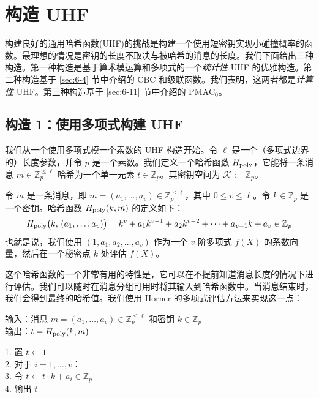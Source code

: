 \section{构造 UHF}\label{sec:7-2}

构建良好的通用哈希函数(UHF)的挑战是构建一个使用短密钥实现小碰撞概率的函数。最理想的情况是密钥的长度不取决与被哈希的消息的长度。我们下面给出三种构造。第一种构造是基于算术模运算和多项式的一个\emph{统计性} UHF 的优雅构造。第二种构造基于 \ref{sec:6-4} 节中介绍的 CBC 和级联函数。我们表明，这两者都是\emph{计算性} UHF。第三种构造基于 \ref{sec:6-11} 节中介绍的 $\mathrm{PMAC}_0$。

\subsection{构造 1：使用多项式构建 UHF}\label{subsec:7-2-1}

我们从一个使用多项式模一个素数的 UHF 构造开始。令 $\ell$ 是一个（多项式边界的）长度参数，并令 $p$ 是一个素数。我们定义一个哈希函数 $H_{\rm poly}$，它能将一条消息 $m\in\mathbb{Z}^{\leq\ell}_p$ 哈希为一个单一元素 $t\in\mathbb{Z}_p$。其密钥空间为 $\mathcal{K}:=\mathbb{Z}_p$。

令 $m$ 是一条消息，即 $m=(a_1,\dots,a_v)\in\mathbb{Z}^{\leq\ell}_p$，其中 $0\leq v\leq\ell$。令 $k\in\mathbb{Z}_p$ 是一个密钥。哈希函数 $H_{\rm poly}(k,m)$ 的定义如下：
\begin{equation}\label{eq:7-3}
H_{\rm poly}\big(k,\,(a_1,\dots,a_v)\big)=k^v+a_1k^{v-1}+a_2k^{v-2}+\cdots+a_{v-1}k+a_v\in\mathbb{Z}_p
\end{equation}
也就是说，我们使用 $(1,a_1,a_2,\dots,a_v)$ 作为一个 $v$ 阶多项式 $f(X)$ 的系数向量，然后在一个秘密点 $k$ 处评估 $f(X)$。

这个哈希函数的一个非常有用的特性是，它可以在不提前知道消息长度的情况下进行评估。我们可以随时在消息分组可用时将其输入到哈希函数中。当消息结束时，我们会得到最终的哈希值。我们使用 Horner 的多项式评估方法来实现这一点：

\vspace{5pt}

\hspace*{5pt} 输入：消息 $m=(a_1,\dots,a_v)\in\mathbb{Z}^{\leq\ell}_p$ 和密钥 $k\in\mathbb{Z}_p$\\
\hspace*{26pt} 输出：$t=H_{\rm poly}(k,m)$

\vspace{5pt}

\hspace*{5pt} 1. \quad 置 $t\leftarrow1$\\
\hspace*{26pt} 2. \quad 对于 $i=1,\dots,v$：\\
\hspace*{26pt} 3. \quad\quad\quad 令 $t\leftarrow t\cdot k+a_i\in\mathbb{Z}_p$\\
\hspace*{26pt} 4. \quad 输出 $t$

